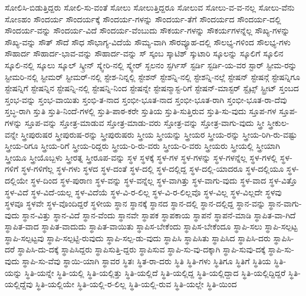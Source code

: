 {ಸೋಲಿಸಿ-ಬಿಡುತ್ತಿದ್ದರು
ಸೋಲಿ-ಸು-ವಂತೆ
ಸೋಲು
ಸೋಲುತ್ತಿದ್ದರೂ
ಸೋಲುವ
ಸೋಲು-ವ-ವ-ನಲ್ಲ
ಸೋಲು-ವೆನು
ಸೋಽಹಂ
ಸೌಂದರ್ಯ
ಸೌಂದರ್ಯಕ್ಕೆ
ಸೌಂದರ್ಯ-ಗಳನ್ನು
ಸೌಂದರ್ಯ-ತೆಗೆ
ಸೌಂದರ್ಯದ
ಸೌಂದರ್ಯ-ದಲ್ಲಿ
ಸೌಂದರ್ಯ-ವನ್ನು
ಸೌಂದರ್ಯ-ವಿದೆ
ಸೌಂದರ್ಯ-ವೆಂಬುದು
ಸೌಕರ್ಯ-ಗಳನ್ನು
ಸೌಕರ್ಯಗಳನ್ನೆಲ್ಲ
ಸೌಖ್ಯ-ಗಳನ್ನು
ಸೌಖ್ಯ-ವನ್ನು
ಸೌತ್
ಸೌದೆ
ಸೌಧ
ಸೌಭಾಗ್ಯ-ವಿದೆಯೆ
ಸೌಮ್ಯ-ವಾಗಿ
ಸೌರವ್ಯೂಹ-ದಲ್ಲಿ
ಸೌಲಭ್ಯ-ಗಳಿಂದ
ಸೌಲಭ್ಯ-ಗಳು
ಸೌಹಾರ್ದ
ಸೌಹಾರ್ದ-ಭಾವ-ವನ್ನು
ಸೌಹಾರ್ದ-ವನ್ನು
ಸ್
ಸ್ಕಂಬ
ಸ್ಕಾಟಿಶ್
ಸ್ಕುಟಾರಿ
ಸ್ಕೂಲನ್ನು
ಸ್ಕೂಲಿಗೆ
ಸ್ಕೂಲಿನ
ಸ್ಕೂಲಿ-ನಲ್ಲಿ
ಸ್ಕೂಲು
ಸ್ಕೂಲ್
ಸ್ಕ್ರೀನ್
ಸ್ಕ್ವೇರಿ-ನಲ್ಲಿ
ಸ್ಕ್ವೇರ್
ಸ್ಖಲನಂ
ಸ್ಟರ್ಗಿಸ್
ಸ್ಟರ್ಡಿ
ಸ್ಟರ್ಡಿ-ಯ-ವರ
ಸ್ಟಾರ್
ಸ್ಟೀಮ-ರನ್ನು
ಸ್ಟೀಮರಿ-ನಲ್ಲಿ
ಸ್ಟೀಮರ್
ಸ್ಟೀಮರ್-ನಲ್ಲಿ
ಸ್ಟೇಶ-ನಿನ್ನಲ್ಲಿ
ಸ್ಟೇಶನ್
ಸ್ಟೇಶನ್ನಿ-ನಲ್ಲಿ
ಸ್ಟೇಶನ್ನಿ-ನಲ್ಲೆ
ಸ್ಟೇಷನ್
ಸ್ಟೇಷನ್ಗೆ
ಸ್ಟೇಷನ್ನಿಗೂ
ಸ್ಟೇಷನ್ನಿಗೆ
ಸ್ಟೇಷನ್ನಿನ
ಸ್ಟೇಷನ್ನಿ-ನಲ್ಲಿ
ಸ್ಟೇಷನ್ನಿ-ನಿಂದ
ಸ್ಟೇಷನ್ನೇ
ಸ್ಟೇಷನ್ಮಾಸ್ಟ-ರಿಗೆ
ಸ್ಟೇಷನ್-ಮಾಸ್ಟರ್
ಸ್ಟೈಟ್ಸ್
ಸ್ಟ್ರೀಟ್
ಸ್ತಂಬದ
ಸ್ತಂಭ-ವನ್ನು
ಸ್ತಂಭ-ವಾಯಿತು
ಸ್ತಂಭಿ-ತ-ನಾದ
ಸ್ತಂಭೀ-ಭೂತ-ನಾದ
ಸ್ತಂಭೀ-ಭೂತ-ರಾಗಿ
ಸ್ತಂಭೀ-ಭೂತ-ರಾ-ದೆವು
ಸ್ತಬ್ಧ-ರಾಗಿ
ಸ್ತುತಿ
ಸ್ತುತಿ-ನಿಂದೆ-ಗಳಲ್ಲಿ
ಸ್ತುತಿ-ಪಾಠ-ಕರೇ
ಸ್ತುತಿಯ
ಸ್ತುತಿ-ಸುತ್ತಿರುವ
ಸ್ತುತಿ-ಸು-ವುದು
ಸ್ತೂಪ-ಗಳ
ಸ್ತೂಪ-ಗಳನ್ನು
ಸ್ತೂಪ-ವನ್ನು
ಸ್ತೋತ್ರ-ಮಾಡುವ
ಸ್ತೋತ್ರ-ಮಾಡು-ವರು
ಸ್ತೋತ್ರ-ವನ್ನು
ಸ್ತೋತ್ರ-ವಾಗು-ವುದು
ಸ್ತ್ರೀ
ಸ್ತ್ರೀಕುಲ-ವನ್ನೇ
ಸ್ತ್ರೀಪುರುಷರ
ಸ್ತ್ರೀಪುರುಷ-ರನ್ನು
ಸ್ತ್ರೀಪುರುಷರು
ಸ್ತ್ರೀಯ
ಸ್ತ್ರೀಯನ್ನು
ಸ್ತ್ರೀಯರ
ಸ್ತ್ರೀಯ-ರನ್ನು
ಸ್ತ್ರೀಯ-ರಿಗಿ-ರು-ವಷ್ಟು
ಸ್ತ್ರೀಯ-ರಿಗೂ
ಸ್ತ್ರೀಯ-ರಿಗೆ
ಸ್ತ್ರೀಯ-ರಿದ್ದರು
ಸ್ತ್ರೀಯ-ರಿ-ರು-ವರು
ಸ್ತ್ರೀಯ-ರಿ-ವರು
ಸ್ತ್ರೀಯರು
ಸ್ತ್ರೀಯಲ್ಲಿ
ಸ್ತ್ರೀಯಾಗಿ
ಸ್ತ್ರೀಯೂ
ಸ್ತ್ರೀಯೊಬ್ಬಳು
ಸ್ತ್ರೀರತ್ನ
ಸ್ತ್ರೀರೂಪ-ವನ್ನು
ಸ್ಥಳ
ಸ್ಥಳಕ್ಕೆ
ಸ್ಥಳ-ಗಳ
ಸ್ಥಳ-ಗಳನ್ನು
ಸ್ಥಳ-ಗಳನ್ನೆಲ್ಲ
ಸ್ಥಳ-ಗಳಲ್ಲಿ
ಸ್ಥಳ-ಗಳಿಗೆ
ಸ್ಥಳ-ಗಳಿಗೆಲ್ಲ
ಸ್ಥಳ-ಗಳು
ಸ್ಥಳದ
ಸ್ಥಳ-ದಂತೆ
ಸ್ಥಳ-ದಲ್ಲಿ
ಸ್ಥಳ-ದಲ್ಲಿದ್ದ
ಸ್ಥಳ-ದಲ್ಲಿ-ಯಾದರೂ
ಸ್ಥಳ-ದಲ್ಲಿಯೂ
ಸ್ಥಳ-ದಲ್ಲಿಯೇ
ಸ್ಥಳ-ದಿಂದ
ಸ್ಥಳ-ಪುರಾಣ
ಸ್ಥಳ-ವನ್ನು
ಸ್ಥಳ-ವನ್ನೆಲ್ಲ
ಸ್ಥಳ-ವಾಗಿತ್ತು
ಸ್ಥಳ-ವಾಗು-ವುದು
ಸ್ಥಳ-ವಾದ
ಸ್ಥಳ-ವಿತ್ತೊ
ಸ್ಥಳ-ವಿದೆ
ಸ್ಥಳ-ವಿದೆ-ಯಲ್ಲ
ಸ್ಥಳ-ವಿದೆಯೆ
ಸ್ಥಳ-ವಿ-ರ-ಲಿಲ್ಲ
ಸ್ಥಳ-ವಿ-ರ-ಲಿಲ್ಲವೊ
ಸ್ಥಳ-ವಿಲ್ಲ
ಸ್ಥಳ-ವಿಲ್ಲದೇ
ಸ್ಥಳವು
ಸ್ಥಳವೂ
ಸ್ಥಳವೇ
ಸ್ಥಳ-ವೊಂದಿದ್ದರೆ
ಸ್ಥಳೀಯ
ಸ್ಥಾನ
ಸ್ಥಾನಕ್ಕೆ
ಸ್ಥಾನದ
ಸ್ಥಾನ-ದಲ್ಲಿ
ಸ್ಥಾನ-ದಲ್ಲಿದ್ದ
ಸ್ಥಾನ-ವನ್ನು
ಸ್ಥಾನ-ವಾಗು-ವುದು
ಸ್ಥಾನ-ವಿತ್ತು
ಸ್ಥಾನ-ವಿದೆ
ಸ್ಥಾನ-ವೆಂದು
ಸ್ಥಾನವೇ
ಸ್ಥಾಪಕ
ಸ್ಥಾಪಕಾಯ
ಸ್ಥಾಪನೆ
ಸ್ಥಾಪನೆ-ಮಾಡಿ
ಸ್ಥಾಪಿತ-ವಾ-ಗಿದೆ
ಸ್ಥಾಪಿತ-ವಾದ
ಸ್ಥಾಪಿತ-ವಾದುದು
ಸ್ಥಾಪಿತ-ವಾಯಿತು
ಸ್ಥಾಪಿಸ-ಬೇಕೆಂದು
ಸ್ಥಾಪಿಸ-ಬೇಕೆಂದೂ
ಸ್ಥಾಪಿ-ಸಲು
ಸ್ಥಾಪಿ-ಸಲ್ಪಟ್ಟ
ಸ್ಥಾಪಿ-ಸಲ್ಪಟ್ಟವು
ಸ್ಥಾಪಿ-ಸಲ್ಪಟ್ಟಿ-ರುವುದು
ಸ್ಥಾಪಿ-ಸಲ್ಪ-ಡು-ವುದು
ಸ್ಥಾಪಿಸಿ
ಸ್ಥಾಪಿಸಿತು
ಸ್ಥಾಪಿಸಿದ
ಸ್ಥಾಪಿಸಿ-ದರು
ಸ್ಥಾಪಿಸಿ-ದರೆ
ಸ್ಥಾಪಿಸಿ-ದು-ದಕ್ಕೆ
ಸ್ಥಾಪಿಸಿದ್ದರು
ಸ್ಥಾಪಿಸುತ್ತಿ-ದ್ದರು
ಸ್ಥಾಪಿಸುವ
ಸ್ಥಾಪಿ-ಸು-ವು-ದಕ್ಕಾಗಿ
ಸ್ಥಾಪಿ-ಸುವು-ದಕ್ಕೆ
ಸ್ಥಾಪಿ-ಸು-ವುದು
ಸ್ಥಾಪಿ-ಸು-ವೆವು
ಸ್ಥಾಯಿ-ಯಾಗಿ
ಸ್ಥಾವರ
ಸ್ಥಿತಃ
ಸ್ಥಿತ-ರಾ-ದರು
ಸ್ಥಿತಿ
ಸ್ಥಿತಿ-ಗಳು
ಸ್ಥಿತಿಗೂ
ಸ್ಥಿತಿಗೆ
ಸ್ಥಿತಿಯ
ಸ್ಥಿತಿ-ಯನ್ನು
ಸ್ಥಿತಿ-ಯನ್ನೇ
ಸ್ಥಿತಿ-ಯಲ್ಲಿ
ಸ್ಥಿತಿ-ಯಲ್ಲಿತ್ತು
ಸ್ಥಿತಿ-ಯಲ್ಲಿದೆ
ಸ್ಥಿತಿ-ಯಲ್ಲಿದ್ದ
ಸ್ಥಿತಿ-ಯಲ್ಲಿದ್ದಾದ
ಸ್ಥಿತಿ-ಯಲ್ಲಿದ್ದಿದ್ದರೆ
ಸ್ಥಿತಿ-ಯಲ್ಲಿದ್ದೆವು
ಸ್ಥಿತಿ-ಯಲ್ಲಿಯೇ
ಸ್ಥಿತಿ-ಯಲ್ಲಿ-ರ-ಲಿಲ್ಲ
ಸ್ಥಿತಿ-ಯಲ್ಲಿ-ರುವ
ಸ್ಥಿತಿ-ಯಲ್ಲೇ
ಸ್ಥಿತಿ-ಯಿಂದ
}
